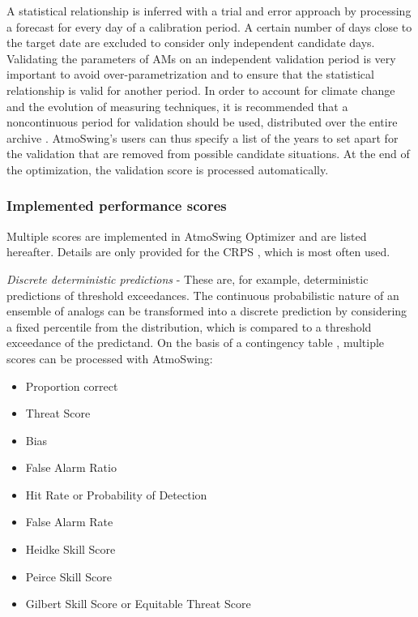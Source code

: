\documentclass[gmd]{copernicus}
\begin{document}
A statistical relationship is inferred with a trial and error approach by processing a forecast for every day of a calibration period. A certain number of days close to the target date are excluded to consider only independent candidate days. Validating the parameters of AMs on an independent validation period is very important to avoid over-parametrization and to ensure that the statistical relationship is valid for another period. In order to account for climate change and the evolution of measuring techniques, it is recommended that a noncontinuous period for validation should be used, distributed over the entire archive \citep{BenDaoud2010, Horton2018b}. AtmoSwing's users can thus specify a list of the years to set apart for the validation that are removed from possible candidate situations. At the end of the optimization, the validation score is processed automatically.


\subsubsection{Implemented performance scores}
\label{sec:scores}

Multiple scores are implemented in AtmoSwing Optimizer and are listed hereafter. Details are only provided for the CRPS \citep[Continuous Ranked Probability Score,][]{Brown1974, Matheson1976, Hersbach2000}, which is most often used. 


\textit{Discrete deterministic predictions} - These are, for example, deterministic predictions of threshold exceedances. The continuous probabilistic nature of an ensemble of analogs can be transformed into a discrete prediction by considering a fixed percentile from the distribution, which is compared to a threshold exceedance of the predictand. On the basis of a contingency table \citep{Wilks2006}, multiple scores can be processed with AtmoSwing:

\begin{itemize}
	\item Proportion correct \citep{Finley1884}
	\item Threat Score \citep{Gilbert1884}
	\item Bias
	\item False Alarm Ratio
	\item Hit Rate or Probability of Detection
	\item False Alarm Rate
	\item Heidke Skill Score \citep{Heidke1926}
	\item Peirce Skill Score \citep{Peirce1884}
	\item Gilbert Skill Score or Equitable Threat Score \citep{Gilbert1884}
\end{itemize}
\end{document}
